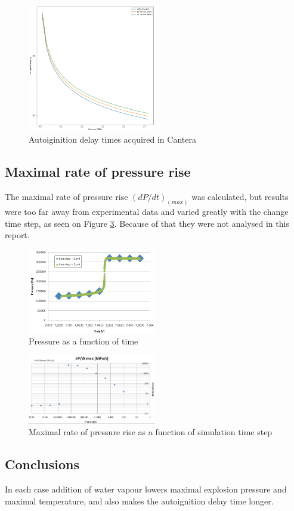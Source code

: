 \documentclass[a4paper]{article}
\begin{document}
\begin{figure}[H]
\centering
\includegraphics[width=0.5\textwidth]{3_adt_to_P.png}
\caption{\label{fig:3_3}Autoiginition delay times acquired in Cantera}
\end{figure}
\subsection{Maximal rate of pressure rise}
The maximal rate of pressure rise $(dP/dt)_(max)$ was calculated, but results were too far away from experimental data and varied greatly with the change time step, as seen on Figure \ref{fig:dPdt_timestep}. Because of that they were not analysed in this report.
\begin{figure}[H]
\centering
\includegraphics[width=0.5\textwidth]{press_time.PNG}
\caption{\label{fig:dPdt}Pressure as a function of time}
\end{figure}

\begin{figure}[H]
\centering
\includegraphics[width=0.5\textwidth]{dpdt_to_timestep.PNG}
\caption{\label{fig:dPdt_timestep}Maximal rate of pressure rise as a function of simulation time step}
\end{figure}


\subsection{Conclusions}
In each case addition of water vapour lowers maximal explosion pressure and maximal temperature, and also makes the autoignition delay time longer.



\end{document}
